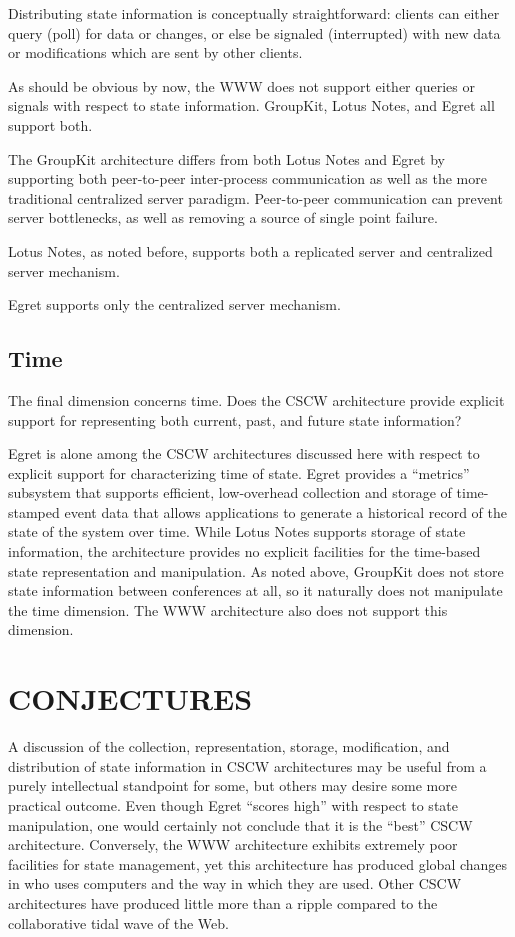 Distributing state information is conceptually straightforward: clients
can either query (poll) for data or changes,  or else be signaled
(interrupted) with new data or modifications which are sent by other 
clients. 

As should be obvious by now, the WWW does not support either queries or
signals with respect to state information. GroupKit, Lotus Notes, and 
Egret all support both.  

The GroupKit architecture differs from both Lotus Notes and Egret by
supporting both peer-to-peer inter-process communication as well as the
more traditional centralized server paradigm.  Peer-to-peer communication
can prevent server bottlenecks, as well as removing a source of single
point failure.  

Lotus Notes, as noted before, supports both a replicated server and
centralized server mechanism.  

Egret supports only the centralized server mechanism.

\subsection{Time}

The final dimension concerns time.  Does the CSCW architecture provide
explicit support for representing both current, past, and future state 
information?  

Egret is alone among the CSCW architectures discussed here with
respect to explicit support for characterizing time of state. Egret
provides a ``metrics'' subsystem that supports efficient, low-overhead
collection and storage of time-stamped event data that allows applications
to generate a historical record of the state of the system over time.
While Lotus Notes supports storage of state information, the architecture
provides no explicit facilities for the time-based state representation and
manipulation.  As noted above, GroupKit does not store state information
between conferences at all, so it naturally does not manipulate the time
dimension. The WWW architecture also does not support this dimension.

\section{CONJECTURES}

A discussion of the collection, representation, storage, modification, and
distribution of state information in CSCW architectures may be useful from
a purely intellectual standpoint for some, but others may desire some more
practical outcome.  Even though Egret ``scores high'' with respect to state
manipulation, one would certainly not conclude that it is the ``best'' CSCW
architecture.  Conversely, the WWW architecture exhibits extremely poor
facilities for state management, yet this architecture has produced global
changes in who uses computers and the way in which they are used.  
Other CSCW architectures have produced little more than a ripple compared
to the collaborative tidal wave of the Web.

